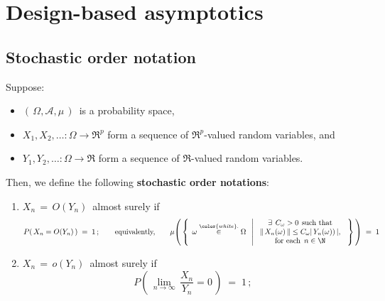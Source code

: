 

\section{Design-based asymptotics}


\subsection{Stochastic order notation}


\begin{definition}
\mbox{}
\vskip 0.1cm
\noindent
Suppose:
\begin{itemize}
\item
    $\left(\,\Omega,\mathscr{A},\mu\,\right)$\,
    is a probability space,
\item
    $X_{1}, X_{2}, \ldots : \Omega \longrightarrow \Re^{p}$
    form a sequence of $\Re^{p}$-valued random variables, and
\item
    $Y_{1}, Y_{2}, \ldots : \Omega \longrightarrow \Re$
    form a sequence of $\Re$-valued random variables.
\end{itemize}
Then, we define the following \textbf{stochastic order notations}:
\begin{enumerate}
\item
    $X_{n} \,=\,O(Y_{n})$\, almost surely if
    \begin{equation*}
    P\!\left(\,X_{n} = O(Y_{n})\,\right) \;=\; 1\,;
    \quad\quad\textnormal{equivalently,}\quad\quad
    \mu\!\left(\,\left\{\;\,
        \omega \overset{{\color{white}.}}{\in} \Omega
        \;\;\left\vert\;
        \begin{array}{c}
        \exists\;\, C_{\omega} > 0 \;\,\textnormal{such that}
        \\
        \Vert\,X_{n}(\omega)\,\Vert \leq C_{\omega}\vert\,Y_{n}(\omega))\,\vert,
        \\
        \textnormal{for each \,$n \in \N$}
        \end{array}
        \right.
        \;\right\}\,\right) \;=\; 1
    \end{equation*}
\item
    $X_{n} \,=\,o(Y_{n})$\, almost surely if
    \begin{equation*}
    P\!\left(\,\underset{n\rightarrow\infty}{\lim}\,\dfrac{X_{n}}{Y_{n}} = 0\,\right) \;=\; 1\,;

\end{equation*}
\end{enumerate}
\end{definition}
